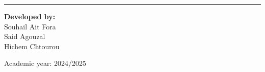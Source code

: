 \begin{titlepage}
    \hrule %
    
    \vspace{1cm}
\begin{center}
   \noindent\large\textbf{Developed by:}\\ 
    \normalsize
     \large {Souhail Ait Fora} \\
    {Said Agouzal} \\
    {Hichem Chtourou} \\  
    \vspace{0.5cm}
    \end{center} 



    
\centering  Academic year: 2024/2025

\end{titlepage}


